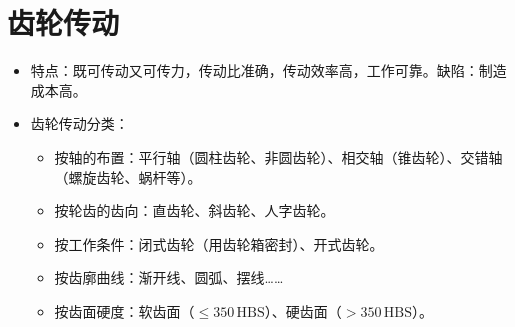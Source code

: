 \documentclass[12pt,a4paper]{article}
\newcommand{\tightlist}{\setlength{\parskip}{0pt}\setlength{\itemsep}{0pt}}
\newcommand{\hint}[1]{\textsf{（#1）}}
\begin{document}
\section{齿轮传动}
\begin{itemize}\tightlist
    \item 特点：既可传动又可传力，传动比准确，传动效率高，工作可靠。缺陷：制造成本高。
    \item 齿轮传动分类：
    \begin{itemize}\tightlist
        \item 按轴的布置：平行轴\hint{圆柱齿轮、非圆齿轮}、相交轴\hint{锥齿轮}、交错轴
        \hint{螺旋齿轮、蜗杆等}。
        \item 按轮齿的齿向：直齿轮、斜齿轮、人字齿轮。
        \item 按工作条件：闭式齿轮\hint{用齿轮箱密封}、开式齿轮。
        \item 按齿廓曲线：渐开线、圆弧、摆线……
        \item 按齿面硬度：软齿面\hint{$\leq350\,\text{HBS}$}、硬齿面\hint{$>350
        \,\text{HBS}$}。
    \end{itemize}
\end{itemize}
\end{document}
